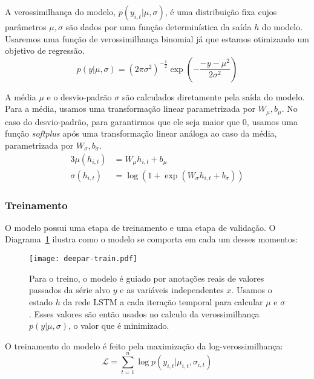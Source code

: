 A verossimilhança do modelo, $p(y_{i,t} | \mu,\sigma)$, é uma distribuição fixa
cujos parâmetros $\mu, \sigma$ são dados por uma função determinística da saída $h$ do modelo. Usaremos uma função de verossimilhança binomial já que estamos otimizando um objetivo de regressão.
\[
  p(y | \mu,\sigma) = {(2\pi\sigma^2)}^{-\frac{1}{2}} \exp(-  \frac{-y - \mu^2}{2\sigma^2})  
\]

A média $\mu$ e o desvio-padrão $\sigma$ são calculados diretamente pela saída do modelo. Para a média, usamos uma transformação linear parametrizada por $W_{\mu},b_{\mu}$. No caso do desvio-padrão, para garantirmos que ele seja maior que 0, usamos uma função \textit{softplus} após uma transformação linear análoga ao caso da média, parametrizada por  $W_{\sigma},b_{\sigma}$.\\

\begin{alignat}{3}
  \mu(h_{i,t}) &= W_{\mu}h_{i,t} + b_{\mu} \\ 
  \sigma(h_{i,t}) &= \log(1 + \exp(W_{\sigma}h_{i,t}+ b_{\sigma}))
\end{alignat}


\subsubsection{Treinamento}


O modelo possui uma etapa de treinamento e uma etapa de validação. O Diagrama~\ref{fig:deepartrain} ilustra como o modelo se comporta em cada um desses momentos: \\


\begin{figure}[H]
  \centering
  \texttt{[image: deepar-train.pdf]}
  \caption{Para o treino, o modelo é guiado por anotações reais de valores
    passados da série alvo $y$ e as variáveis independentes $x$. Usamos o estado
  $h$ da rede LSTM a cada iteração temporal para calcular $\mu$  e $\sigma$.
  Esses valores são então usados no calculo da verossimilhança $p(y |
  \mu,\sigma)$, o valor que é minimizado.}
  \label{fig:deepartrain}
\end{figure}


O treinamento do modelo é feito pela maximização da log-verossimilhança: \\

\begin{equation}
  \mathcal{L} = \sum^n_{t=1}{\log p(y_{i,t} | \mu_{i,t},\sigma_{i,t})}
  \end{equation}

